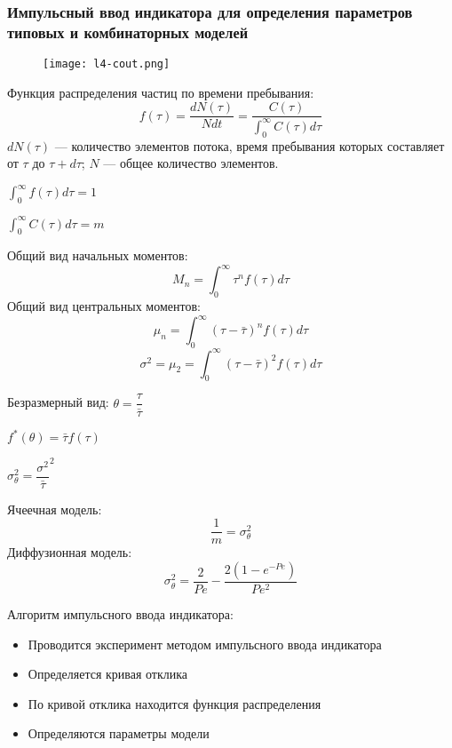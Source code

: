 \begin{frame}
	\frametitle{Импульсный ввод индикатора для определения параметров типовых и комбинаторных моделей}
	
	
	\begin{figure}[h]
		\texttt{[image: l4-cout.png]}
	\end{figure}
\end{frame}

\begin{frame}
	Функция распределения частиц по времени пребывания:
	\begin{equation}
		f( \tau ) = \dfrac{ dN (\tau) } { N dt } = \dfrac {C( \tau )} { \int_0^\infty C(\tau) d \tau }
	\end{equation}
	$dN(\tau)$ --- количество элементов потока, время пребывания которых составляет от $\tau$ до $\tau + d \tau$; $N $ --- общее количество элементов.
	
	$\int_0^\infty f( \tau ) d \tau = 1$

	$\int_0^\infty C( \tau ) d \tau = m$
\end{frame}

\begin{frame}
	Общий вид начальных моментов:
	\begin{equation}
		M_n = \int_0^\infty \tau^n f( \tau ) d \tau
	\end{equation}
	Общий вид центральных моментов:
	\begin{equation}
		\mu_n=\int_0^\infty ( \tau - \bar{\tau} )^n f( \tau)d\tau
	\end{equation}
	\begin{equation}
		\sigma^2= \mu_2=\int_0^\infty (\tau - \bar{\tau} )^2 f(\tau)d\tau
	\end{equation}	
		
	Безразмерный вид:
	$\theta = \dfrac{\tau} {\bar{\tau}}$
	
	$f^*(\theta ) = \bar{\tau} f(\tau )$
	
	$\sigma_\theta^2=\dfrac{\sigma^2} {\bar{\tau} }^2$
	
\end{frame}

\begin{frame}
	Ячеечная модель:
	\begin{equation}
		\dfrac{1} {m} = \sigma^2_\theta
	\end{equation}
	Диффузионная модель:
	\begin{equation}
		\sigma^2_\theta = \dfrac {2}{Pe} - \dfrac{2 (1-e^{-Pe}  )} {Pe^2}
	\end{equation}
	
	Алгоритм импульсного ввода индикатора:
	\begin{itemize}
		\item Проводится эксперимент методом импульсного ввода индикатора
		\item Определяется кривая отклика
		\item По кривой отклика находится функция распределения
		\item Определяются параметры модели
	\end{itemize}
	
\end{frame}

